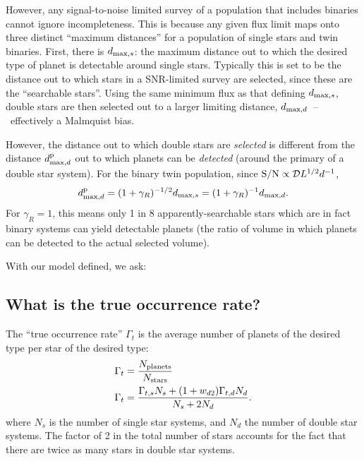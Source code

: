 \documentclass{emulateapj}
\begin{document}
However, any signal-to-noise limited survey of a population that includes 
binaries cannot ignore incompleteness.
This is because any given flux limit maps onto three distinct ``maximum 
distances'' for a population of single stars and twin binaries.
First, there is $d_{{\rm max},s}$: the maximum distance out to which the 
desired type of planet is detectable around single stars. Typically this is 
set to be the distance out to which stars in a SNR-limited survey are 
selected, since these are the ``searchable stars''.
Using the same minimum flux as that defining $d_{{\rm max},s}$, double stars 
are then selected out to a larger limiting distance, $d_{{\rm 
max},d}$~--~effectively a Malmquist bias.

However, the distance out to which double stars are {\it selected} is 
different from the distance $d_{{\rm max},d}^{\rm p}$ out to which planets can 
be {\it detected} (around the primary of a double star system).
For the binary twin population, since ${\rm S/N} \propto \mathcal{D} 
L^{1/2} d^{-1}$,
\begin{equation}
d_{{\rm max},d}^{\rm p} = (1 + \gamma_R)^{-1/2} d_{{\rm max},s} = 
(1 + \gamma_R)^{-1} d_{{\rm max},d}.
\end{equation}
For $\gamma_R = 1$, this means only 1 in 8 apparently-searchable stars which 
are in fact binary systems can yield detectable planets (the ratio of 
volume in which planets can be detected to the actual selected volume).

  

With our model defined, we ask:

\subsection{What is the true occurrence rate?}
\label{sec:true_rate}

The ``true occurrence rate'' $\Gamma_t$ is the average number of planets of 
the desired type per star of the desired type:
\begin{align}
\Gamma_t &= \frac{N_{\rm planets}}{N_{\rm stars}} \\
\Gamma_t &= \frac{\Gamma_{t,s} N_s + (1+w_{d2}) \Gamma_{t,d} N_d}{N_s + 2N_d}.
\label{eq:true_occ}
\end{align}
where $N_s$ is the number of single star systems, and $N_d$ the number of 
double star systems. 
The factor of 2 in the total number of stars accounts for the fact that there 
are twice as many stars in double star systems.
\end{document}
